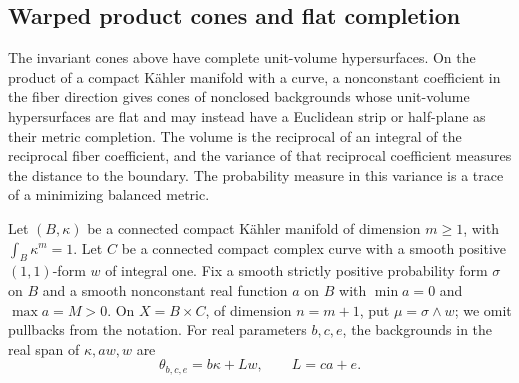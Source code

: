 \subsection{Warped product cones and flat completion}
\label{sec:warped-gauduchon-completion}

The invariant cones above have complete unit-volume hypersurfaces. On the product of a compact K\"ahler manifold with a curve, a nonconstant coefficient in the fiber direction gives cones of nonclosed backgrounds whose unit-volume hypersurfaces are flat and may instead have a Euclidean strip or half-plane as their metric completion. The volume is the reciprocal of an integral of the reciprocal fiber coefficient, and the variance of that reciprocal coefficient measures the distance to the boundary. The probability measure in this variance is a trace of a minimizing balanced metric.

Let $(B,\kappa)$ be a connected compact K\"ahler manifold of dimension $m\geq1$, with $\int_B\kappa^m=1$. Let $C$ be a connected compact complex curve with a smooth positive $(1,1)$-form $w$ of integral one. Fix a smooth strictly positive probability form $\sigma$ on $B$ and a smooth nonconstant real function $a$ on $B$ with $\min a=0$ and $\max a=M>0$. On $X=B\times C$, of dimension $n=m+1$, put $\mu=\sigma\wedge w$; we omit pullbacks from the notation. For real parameters $b,c,e$, the backgrounds in the real span of $\kappa,aw,w$ are
\[
 \theta_{b,c,e}=b\kappa+Lw,\qquad L=ca+e.
\]

